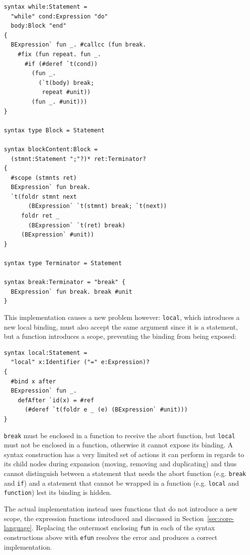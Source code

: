 \documentclass{kththesis}
\begin{document}
\begin{verbatim}
syntax while:Statement =
  "while" cond:Expression "do"
  body:Block "end"
{
  BExpression` fun _. #callcc (fun break.
    #fix (fun repeat. fun _.
      #if (#deref `t(cond))
        (fun _.
          (`t(body) break;
           repeat #unit))
        (fun _. #unit)))
}

syntax type Block = Statement

syntax blockContent:Block =
  (stmnt:Statement ";"?)* ret:Terminator?
{
  #scope (stmnts ret)
  BExpression` fun break.
  `t(foldr stmnt next
       (BExpression` `t(stmnt) break; `t(next))
     foldr ret _
       (BExpression` `t(ret) break)
     (BExpression` #unit))
}

syntax type Terminator = Statement

syntax break:Terminator = "break" {
  BExpression` fun break. break #unit
}
\end{verbatim}

This implementation causes a new problem however: \texttt{local}, which introduces a new local binding, must also accept the same argument since it is a statement, but a function introduces a scope, preventing the binding from being exposed:

\begin{verbatim}
syntax local:Statement =
  "local" x:Identifier ("=" e:Expression)?
{
  #bind x after
  BExpression` fun _.
    defAfter `id(x) = #ref
      (#deref `t(foldr e _ (e) (BExpression` #unit)))
}
\end{verbatim}

\texttt{break} must be enclosed in a function to receive the abort function, but \texttt{local} must not be enclosed in a function, otherwise it cannot expose its binding. A syntax construction has a very limited set of actions it can perform in regards to its child nodes during expansion (moving, removing and duplicating) and thus cannot distinguish between a statement that needs the abort function (e.g. \texttt{break} and \texttt{if}) and a statement that cannot be wrapped in a function (e.g. \texttt{local} and \texttt{function}) lest its binding is hidden.

The actual implementation instead uses functions that do not introduce a new scope, the expression functions introduced and discussed in Section~\ref{sec:core-language}. Replacing the outermost enclosing \texttt{fun} in each of the syntax constructions above with \texttt{efun} resolves the error and produces a correct implementation.
\end{document}

